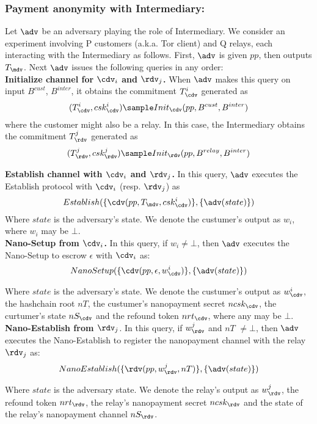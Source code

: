 \subsubsection{Payment anonymity with Intermediary:} 
Let $\adv$ be an adversary playing the role of Intermediary. We consider an experiment involving P customers (a.k.a. Tor client) and Q relays, each interacting with the Intermediary as follows. First, $\adv$ is given $pp$, then outputs $T_\mdv$. Next $\adv$ issues the following queries in any order:\\

\textbf{Initialize channel for $\cdv_i$ and $\rdv_j$.} When $\adv$ makes this query on input $B^{cust}$, $B^{inter}$, it obtains the commitment $T^i_\cdv$ generated as 
$$(T^i_\cdv, csk^i_\cdv) \sample Init_\cdv(pp, B^{cust}, B^{inter})$$
where the customer might also be a relay. In this case, the Intermediary obtains the commitment $T^j_\rdv$ generated as $$(T^j_\rdv, csk^j_\rdv) \sample Init_\rdv(pp, B^{relay}, B^{inter})$$  

\textbf{Establish channel with $\cdv_i$ and $\rdv_j$.} In this query, $\adv$ executes the Establish protocol with $\cdv_i$ (resp. $\rdv_j$) as
$$Establish(\{\cdv(pp, T_\mdv, csk^i_\cdv)\},\{\adv(state)\})$$
Where $state$ is the adversary's state. We denote the custumer's output as $w_i$, where $w_i$ may be $\bot$.\\

\textbf{Nano-Setup from $\cdv_i$.} In this query, if $w_i \neq \bot$, then $\adv$ executes the Nano-Setup to escrow $\epsilon$ with $\cdv_i$ as:
$$Nano\-Setup(\{\cdv(pp, \epsilon, w^i_\cdv)\}, \{\adv(state)\})$$

Where $state$ is the adversary's state. We denote the custumer's output as $w^i_\cdv$, the hashchain root $nT$, the custumer's nanopayment secret $ncsk_\cdv$, the curtumer's state $nS_\cdv$ and the refound token $nrt_\cdv$, where any may be $\bot$.\\

\textbf{Nano-Establish from $\rdv_j$}. In this query, if $w^j_\rdv$ and $nT$ $\neq \bot$, then $\adv$ executes the Nano-Establish to register the nanopayment channel with the relay $\rdv_j$ as:
$$Nano\-Establish(\{\rdv(pp, w^j_\rdv, nT)\}, \{\adv(state)\})$$

Where $state$ is the adversary state. We denote the relay's output as $w^j_\rdv$, the refound token $nrt_\rdv$, the relay's nanopayment secret $ncsk_\rdv$ and the state of the relay's nanopayment channel $nS_\rdv$. \\

